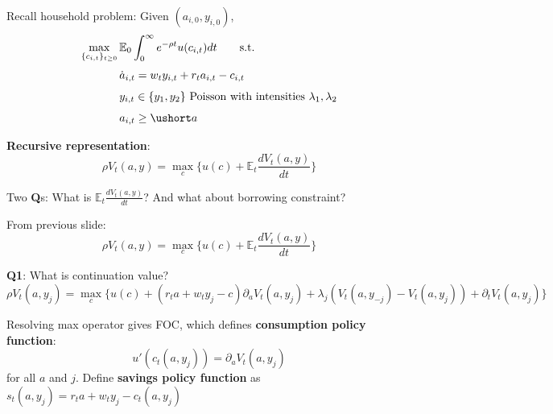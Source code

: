 \documentclass[11pt, aspectratio=169]{beamer}
\begin{document}
\begin{frame}{}

\vspace{5mm}
Recall household problem: Given $(a_{i, 0}, y_{i, 0})$,
\begin{equation*}\label{HH}\begin{split}
	\max_{\{c_{i, t}\}_{t \geq 0}} \, 
		& \mathbb E_0 \int_0^\infty e^{-\rho t} u(c_{i, t}) dt \quad \quad \mbox{s.t.} \\[2pt]
		&\dot a_{i, t} = w_t y_{i, t} + r_t a_{i, t} - c_{i, t} \\[4pt]
		&y_{i, t} \in \{y_1, y_2\} \ \mbox{Poisson with intensities} \ \lambda_1,\lambda_2\\[4pt]
		&a_{i, t} \geq \ushort a \end{split}
\end{equation*}


\pause
\vspace{6mm}
\noindent
\textbf{Recursive representation}:
\begin{equation*}
	\rho V_t(a, y) = \max_c \bigg\{ u(c) + \mathbb E_t \frac{d V_t(a, y)}{dt} \bigg\}
\end{equation*}

\vspace{2mm}
Two \textbf{Q}s: What is $\mathbb E_t \frac{d V_t(a, y)}{dt}$? And what about borrowing constraint? 
\end{frame}


\begin{frame}{}

From previous slide:
\begin{equation*}
	\rho V_t(a, y) = \max_c \bigg\{ u(c) + \mathbb E_t \frac{d V_t(a, y)}{dt} \bigg\}
\end{equation*}


\vspace{6mm}
\textbf{Q1}: What is continuation value?
\pause
\begin{equation*}
	\rho V_t(a, y_j) = \max_c \bigg\{ u(c) + (r_t a + w_t y_j - c) \partial_a V_t(a, y_j) + \lambda_j(V_t(a, y_{-j}) - V_t(a, y_j)) + \partial_t V_t(a, y_j) \bigg\}
\end{equation*}


\vspace{4mm}
Resolving max operator gives FOC, which defines \textbf{consumption policy function}:
\begin{equation*}
	u'(c_t(a, y_j)) = \partial_a V_t(a, y_j)
\end{equation*}
for all $a$ and $j$. Define \textbf{savings policy function} as $s_t(a, y_j) = r_t a + w_t y_j - c_t(a, y_j)$

\end{frame}
\end{document}
